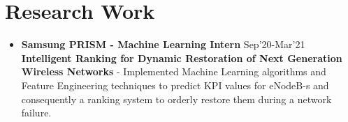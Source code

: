 \documentclass{article}
\begin{document}
\begin{itemize}

\end{itemize}



\section*{Research Work}
\begin{itemize}
    \item{\textbf{\large{Samsung PRISM - Machine Learning Intern}}} \hfill \textmd{Sep'20-Mar'21}
          \newline
          \textbf{Intelligent Ranking for Dynamic Restoration of Next Generation Wireless Networks}
          \newline
          \textmd{- Implemented Machine Learning algorithms and Feature Engineering techniques to predict KPI values for eNodeB-s and consequently a ranking system to orderly restore them during a network failure.}
\end{itemize}

\end{document}
